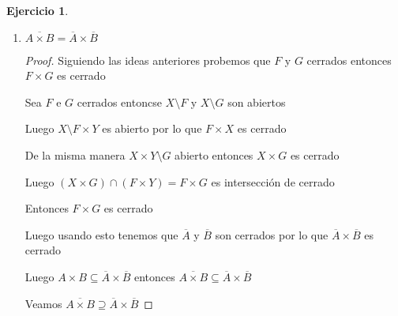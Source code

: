 \documentclass[12pt]{article}
\newcommand{\ol}{\overline}
\newcommand{\open}{\mathrm{o}}
\theoremstyle{definition}
\newtheorem{ej}{Ejercicio}
\begin{document}
\begin{ej}
\begin{enumerate}
\begin{proof}
	Luego $d((x',y')(x,y)) = d_{1}(x',x) + d_{2}(y',y) < \frac{r}{2} + \frac{r}{2} = r$

	entonces $(x',y') \in B_{r}(x,y) \subset A \times B$

	Luego $x' \in A$ y tambien $y' \in B$

	$B(x,\frac{r}{2}) \subseteq A$ y por otro lado $B(y,\frac{r}{2}) \subseteq B$

	Entonces $x \in A^{\open}$ e $y \in B^{\open}$ luego $(x,y) \in A^{\open} \times B^{\open}$  
      \end{proof}
    \item $\ol{A\times B} = \ol{A} \times \ol{B}$
      \begin{proof}
	Siguiendo las ideas anteriores probemos que $F$ y $G$ cerrados entonces $F \times G$ es cerrado

	Sea $F$ e $ G$ cerrados entoncse $X \setminus F$ y $X \setminus G$ son abiertos 

	Luego $X \setminus F \times Y$ es abierto por lo que $F \times X$ es cerrado

	De la misma manera $X \times Y \setminus G$ abierto entonces $X \times G$ es cerrado

	Luego $(X \times G )\cap (F \times Y) = F\times G$ es intersección de cerrado

	Entonces $F \times G$ es cerrado

	Luego usando esto tenemos que $\ol A$ y $\ol B$ son cerrados por lo que $\ol A \times \ol B$ es cerrado

	Luego $A \times B \subseteq \ol A \times \ol B$ entonces $\ol{A \times B} \subseteq \ol A \times \ol B$

	Veamos $\ol{A \times B} \supseteq \ol A \times \ol B$
      \end{proof}
  \end{enumerate}
\end{ej}
\end{document}
